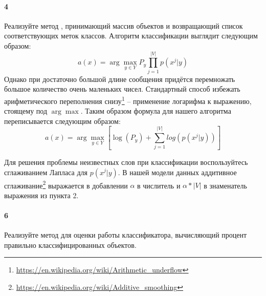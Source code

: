 \documentclass[a4paper,12pt]{article}
\begin{document}
\paragraph{4} Реализуйте метод , принимающий массив объектов  и возвращающий список соответствующих меток классов. 
Алгоритм классификации выглядит следующим образом:
$$a(x) = \arg\max\limits_{y \in Y}  P_y \prod\limits_{j=1}^{|V|} p(x^j |y)$$
Однако при достаточно большой длине сообщения придётся перемножать большое количество очень маленьких чисел. Стандартный способ избежать арифметического переполнения снизу\footnote{\url{https://en.wikipedia.org/wiki/Arithmetic_underflow}} -- применение логарифма к выражению, стоящему под $\arg\max$. Таким образом формула для нашего алгоритма переписывается следующим образом:\\
$$a(x) = \arg\max\limits_{y \in Y} [ \log(P_y) + \sum\limits_{j=1}^{|V|} log(p(x^j |y))]$$

Для решения проблемы неизвестных слов при классификации воспользуйтесь сглаживанием Лапласа для $p(x^j | y)$.
В нашей модели данных аддитивное сглаживание\footnote{\url{https://en.wikipedia.org/wiki/Additive_smoothing}} выражается в добавлении $\alpha$ в числитель и $\alpha * |V|$ в знаменатель выражения из пункта 2.

\paragraph{6} Реализуйте метод  для оценки работы классификатора, вычисляющий процент правильно классифицированных объектов.
\end{document}

